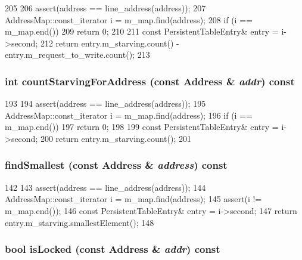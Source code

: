 \begin{DoxyCode}
205 {
206     assert(address == line_address(address));
207     AddressMap::const_iterator i = m_map.find(address);
208     if (i == m_map.end())
209         return 0;
210 
211     const PersistentTableEntry& entry = i->second;
212     return entry.m_starving.count() - entry.m_request_to_write.count();
213 }
\end{DoxyCode}
\hypertarget{classPersistentTable_ac7209c5a747491d956abe358ea30b987}{
\subsubsection[{countStarvingForAddress}]{\setlength{\rightskip}{0pt plus 5cm}int countStarvingForAddress (const {\bf Address} \& {\em addr}) const}}
\label{classPersistentTable_ac7209c5a747491d956abe358ea30b987}



\begin{DoxyCode}
193 {
194     assert(address == line_address(address));
195     AddressMap::const_iterator i = m_map.find(address);
196     if (i == m_map.end())
197         return 0;
198 
199     const PersistentTableEntry& entry = i->second;
200     return entry.m_starving.count();
201 }
\end{DoxyCode}
\hypertarget{classPersistentTable_a2a83d43cb75685cce8e2beb456e71375}{
\subsubsection[{findSmallest}]{ findSmallest (const {\bf Address} \& {\em address}) const}}
\label{classPersistentTable_a2a83d43cb75685cce8e2beb456e71375}



\begin{DoxyCode}
142 {
143     assert(address == line_address(address));
144     AddressMap::const_iterator i = m_map.find(address);
145     assert(i != m_map.end());
146     const PersistentTableEntry& entry = i->second;
147     return entry.m_starving.smallestElement();
148 }
\end{DoxyCode}
\hypertarget{classPersistentTable_a1fdc9104426b06c2dda1a9bef5f7ec58}{
\subsubsection[{isLocked}]{\setlength{\rightskip}{0pt plus 5cm}bool isLocked (const {\bf Address} \& {\em addr}) const}}
\label{classPersistentTable_a1fdc9104426b06c2dda1a9bef5f7ec58}



